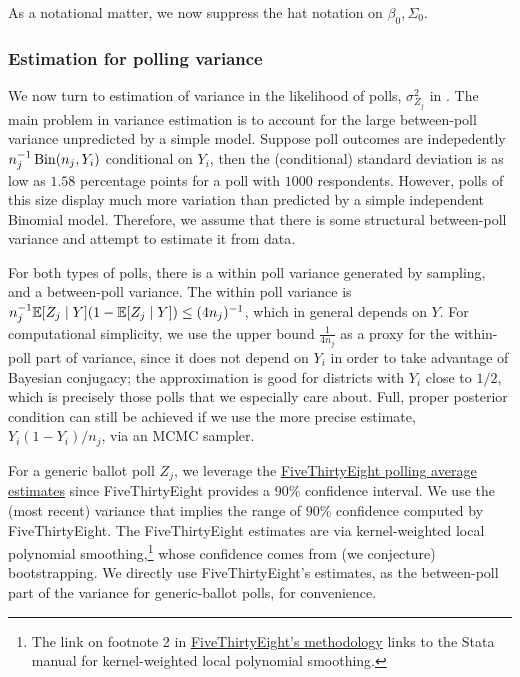 \documentclass[11pt]{article}
\begin{document}
As a notational matter, we now suppress the hat notation on $\beta_0, \Sigma_0.$

\subsubsection{Estimation for polling variance}

We now turn to estimation of variance in the likelihood of polls, $\sigma_{Z_j}^2$ in . The main problem in variance estimation is to account for the large between-poll variance unpredicted by a simple model. Suppose poll outcomes are indepedently $n_j^{-1} \operatorname{Bin}(n_j, Y_i)$ conditional on $Y_i$, then the (conditional) standard deviation is as low as $1.58$ percentage points for a poll with $1000$ respondents. However, polls of this size display much more variation than predicted by a simple independent Binomial model. Therefore, we assume that there is some structural between-poll variance and attempt to estimate it from data.  

For both types of polls, there is a within poll variance generated by sampling, and a between-poll variance. The within poll variance is $n_j^{-1}\mathbb{E}[Z_j \mid Y](1-\mathbb{E}[Z_j\mid Y]) \le (4n_j)^{-1}$, which in general depends on $Y$. For computational simplicity, we use the upper bound $\frac{1}{4n_j}$ as a proxy for the within-poll part of variance, since it does not depend on $Y_i$ in order to take advantage of Bayesian conjugacy; the approximation is good for districts with $Y_i$ close to $1/2$, which is precisely those polls that we especially care about. Full, proper posterior condition can still be achieved if we use the more precise estimate, $Y_i(1-Y_i)/n_j$, via an MCMC sampler. 

For a generic ballot poll $Z_j$, we leverage the \href{https://projects.fivethirtyeight.com/congress-generic-ballot-polls/}{FiveThirtyEight polling average estimates} since FiveThirtyEight provides a 90\% confidence interval. We use the (most recent) variance that implies the range of $90\%$ confidence computed by FiveThirtyEight. The FiveThirtyEight estimates are via kernel-weighted local polynomial smoothing,\footnote{The link on footnote 2 in \href{https://fivethirtyeight.com/features/heres-a-new-less-volatile-version-of-our-generic-ballot-tracker/}{FiveThirtyEight's methodology} links to the Stata manual for kernel-weighted local polynomial smoothing.} whose confidence comes from (we conjecture) bootstrapping. We directly use FiveThirtyEight's estimates, as the between-poll part of the variance for generic-ballot polls, for convenience. 
\end{document}
